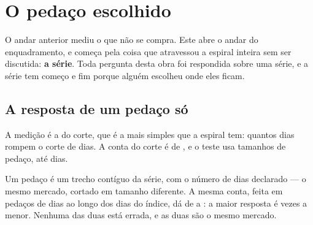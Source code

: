 \chapter{O pedaço escolhido}\label{cap:pedaco}

O andar anterior mediu o que não se compra. Este abre o andar do enquadramento, e começa pela coisa
que atravessou a espiral inteira sem ser discutida: \textbf{a série}. Toda pergunta desta obra foi
respondida sobre uma série, e a série tem começo e fim porque alguém escolheu onde eles ficam.

\section{A resposta de um pedaço só}

A medição é a do corte, que é a mais simples que a espiral tem: quantos dias rompem o
corte de \numPedacoJanela{} dias. A conta do corte é de \numPedacoPromessa{}, e o teste usa
\numPedacoTamanhos{} tamanhos de pedaço, até \numPedacoMaior{} dias.

Um pedaço é um trecho contíguo da série, com o número de dias declarado --- o mesmo mercado, cortado em
tamanho diferente. A mesma conta, feita em pedaços de \numPedacoMenor{} dias ao longo dos \numPedacoDiasA{} dias do
índice, dá de \numPedacoEntregaMenorDoisAnos{} a \numPedacoEntregaMaiorDoisAnos{}: a maior resposta é
\numPedacoEntregaRazaoDoisAnos{} vezes a menor. Nenhuma das duas está errada, e as duas são o mesmo
mercado.

\begin{table}[htbp]
  \centering
  \small
  \caption{A entrega do corte medida em pedaços de três tamanhos. A última coluna é o que a conta de
    sempre prevê para a dispersão entre pedaços, que é a conta de quem supõe dias independentes:
    $\sqrt{p(1-p)/n}$.}
  \label{tab:pedacos}
\end{table}

